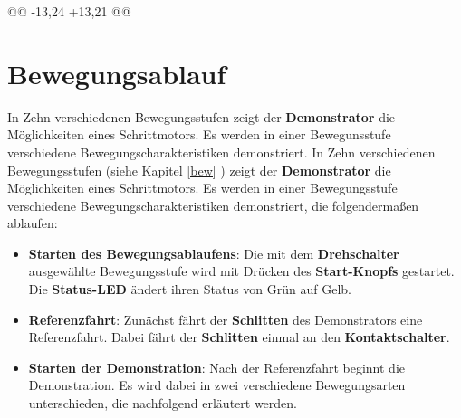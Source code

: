 @@ -13,24 +13,21 @@

\chapter{Bewegungsablauf}

In Zehn verschiedenen Bewegungsstufen zeigt der \textbf{Demonstrator} die Möglichkeiten eines Schrittmotors. Es werden in einer Bewegunsstufe verschiedene Bewegungscharakteristiken demonstriert. 
In Zehn verschiedenen Bewegungsstufen (siehe Kapitel \ref{bew} ) zeigt der \textbf{Demonstrator} die Möglichkeiten eines Schrittmotors. Es werden in einer Bewegungsstufe verschiedene Bewegungscharakteristiken demonstriert, die folgendermaßen ablaufen:  

\begin{itemize}
\item \textbf{Starten des Bewegungsablaufens}: Die mit dem \textbf{Drehschalter} ausgewählte Bewegungsstufe wird mit Drücken des \textbf{Start-Knopfs} gestartet. Die \textbf{Status-LED} ändert ihren Status von Grün auf Gelb.  
\end{itemize}

\begin{itemize}
\item \textbf{Referenzfahrt}: Zunächst fährt der \textbf{Schlitten} des Demonstrators eine Referenzfahrt. Dabei fährt der \textbf{Schlitten} einmal an den \textbf{Kontaktschalter}.
\end{itemize}

\begin{itemize}
\item \textbf{Starten der Demonstration}: Nach der Referenzfahrt beginnt die Demonstration. Es wird dabei in zwei verschiedene Bewegungsarten unterschieden, die nachfolgend erläutert werden.
\end{itemize}

